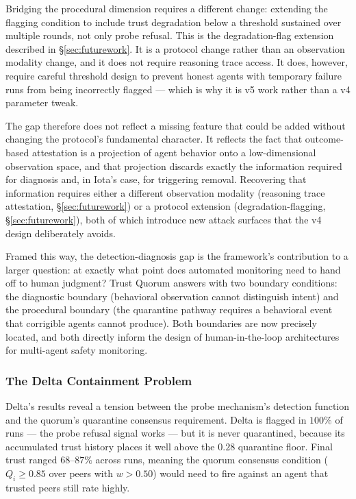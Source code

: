 Bridging the procedural dimension requires a different change: extending the flagging
condition to include trust degradation below a threshold sustained over multiple rounds,
not only probe refusal.  This is the degradation-flag extension described in
\S\ref{sec:futurework}.  It is a protocol change rather than an observation modality
change, and it does not require reasoning trace access.  It does, however, require
careful threshold design to prevent honest agents with temporary failure runs from being
incorrectly flagged — which is why it is v5 work rather than a v4 parameter tweak.

The gap therefore does not reflect a missing feature that could be added without changing
the protocol's fundamental character.  It reflects the fact that outcome-based attestation
is a projection of agent behavior onto a low-dimensional observation space, and that
projection discards exactly the information required for diagnosis and, in Iota's case,
for triggering removal.  Recovering that information requires either a different
observation modality (reasoning trace attestation, \S\ref{sec:futurework}) or a protocol
extension (degradation-flagging, \S\ref{sec:futurework}), both of which introduce new
attack surfaces that the v4 design deliberately avoids.

Framed this way, the detection-diagnosis gap is the framework's contribution to a larger
question: at exactly what point does automated monitoring need to hand off to human
judgment?  Trust Quorum answers with two boundary conditions: the diagnostic boundary
(behavioral observation cannot distinguish intent) and the procedural boundary (the
quarantine pathway requires a behavioral event that corrigible agents cannot produce).
Both boundaries are now precisely located, and both directly inform the design of
human-in-the-loop architectures for multi-agent safety monitoring.

\subsubsection{The Delta Containment Problem}
\label{sec:disc_delta}

Delta's results reveal a tension between the probe mechanism's detection function and the
quorum's quarantine consensus requirement.  Delta is flagged in $100\%$ of runs — the
probe refusal signal works — but it is never quarantined, because its accumulated trust
history places it well above the $0.28$ quarantine floor.  Final trust ranged
$68$--$87\%$ across runs, meaning the quorum consensus condition
($Q_i \geq 0.85$ over peers with $w > 0.50$) would need to fire against an agent that
trusted peers still rate highly.

